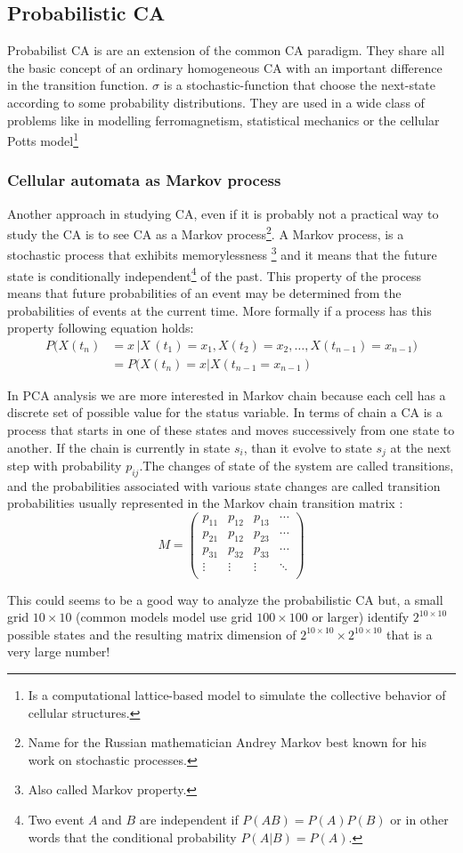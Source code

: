 \subsection{Probabilistic CA}
Probabilist CA is are an extension of the common CA paradigm. They share all
the basic concept of an ordinary homogeneous
CA with an important difference in the transition function.
$\sigma$ is a stochastic-function that choose the next-state
according to some probability distributions. They are used in a wide class of
problems like in modelling ferromagnetism, statistical mechanics
\cite{Vichniac1984} or the cellular Potts model\footnote{Is a computational
lattice-based model to simulate the collective behavior of cellular structures.}


\subsubsection{Cellular automata as Markov process}
Another approach in studying CA, even if it is probably not a practical
way to study the CA is to see CA as a Markov process\footnote{Name for the
Russian mathematician Andrey Markov best known for his work on stochastic
processes.}. A Markov process, is a stochastic process that exhibits
memorylessness \footnote{Also called Markov property.} and it means that the
future state is conditionally independent\footnote{Two event
$A$ and $B$ are independent if
$P(A B)=P(A)P(B)$ or in other words that the conditional
probability $P(A|B)=P(A)$.} of the past.
This property of the process means that future probabilities of an event may be
determined from the probabilities of events at the current time.
More formally if a process has this property following  equation holds:
\begin{align*}
P(X(t_n)&= x \,| X\,(t_1) = x_1,X(t_2) = x_2, \ldots,X(t_{n-1})=x_{n-1}) \\
&= P(X(t_n)=x | X(t_{n-1}=x_{n-1})
\end{align*}

In PCA analysis we are more interested in Markov chain because each cell has a
discrete set of possible value for the status variable.
In terms of chain a CA is a process that starts in one of these states and moves
successively from one state to another. If the chain is currently in state
$s_i$, than it evolve to state $s_j$ at
the next step with probability $p_{ij}$.The changes of state
of the system are called transitions, and the probabilities associated with
various state changes are called transition probabilities usually represented
in the Markov chain transition matrix :
\[
M =
\left( {\begin{array}{cccc}
p_{11} & p_{12} & p_{13} &\cdots \\
p_{21} & p_{12} & p_{23} &\cdots \\
p_{31} & p_{32} & p_{33} &\cdots \\
\vdots & \vdots  &\vdots& \ddots\\
\end{array} } \right)
\]

This could seems to be a good way to analyze the probabilistic CA but, a
small grid  $10\times10$ (common models model use grid
$100\times100$ or larger) identify
$2^{10\times10}$possible states and the resulting matrix
dimension of $2^{10\times10}\times2^{10\times10}$ that is a
very large number!
